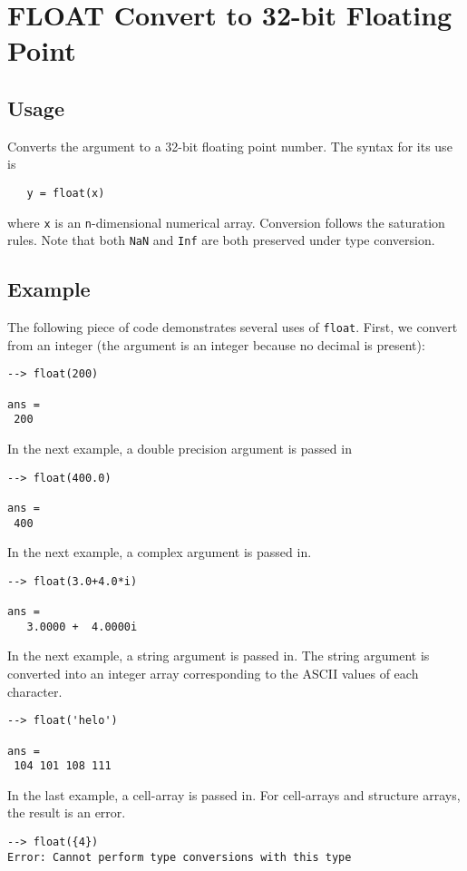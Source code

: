 \section{FLOAT Convert to 32-bit Floating Point}

\subsection{Usage}

Converts the argument to a 32-bit floating point number.  The syntax
for its use is
\begin{verbatim}
   y = float(x)
\end{verbatim}
where \verb|x| is an \verb|n|-dimensional numerical array.  
Conversion follows the saturation rules.  Note that both 
\verb|NaN| and \verb|Inf| are both preserved under type conversion.
\subsection{Example}

The following piece of code demonstrates several uses of \verb|float|. 
First, we convert from an integer (the argument is an integer 
because no decimal is present):
\begin{verbatim}
--> float(200)

ans = 
 200 
\end{verbatim}
In the next example, a double precision argument is passed 
in
\begin{verbatim}
--> float(400.0)

ans = 
 400 
\end{verbatim}
In the next example, a complex argument is passed in.
\begin{verbatim}
--> float(3.0+4.0*i)

ans = 
   3.0000 +  4.0000i 
\end{verbatim}
In the next example, a string argument is passed in.  The string 
argument is converted into an integer array corresponding to the 
ASCII values of each character.
\begin{verbatim}
--> float('helo')

ans = 
 104 101 108 111 
\end{verbatim}
In the last example, a cell-array is passed in.  For cell-arrays 
and structure arrays, the result is an error.
\begin{verbatim}
--> float({4})
Error: Cannot perform type conversions with this type
\end{verbatim}
